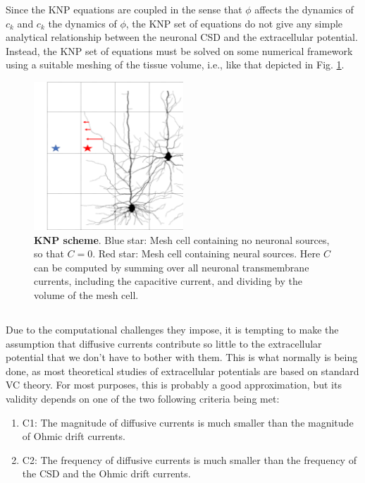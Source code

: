 Since the KNP equations are coupled in the sense that $\phi$ affects the dynamics of $c_k$ and $c_k$ the dynamics of $\phi$, the KNP set of equations do not give any simple analytical relationship between the neuronal CSD and the extracellular potential. Instead, the KNP set of equations must be solved on some numerical framework using a suitable meshing of the tissue volume, i.e., like that depicted in Fig. \ref{Eldiff:fig:KNPmesh}.

\begin{figure}[!ht]
\begin{center}
\includegraphics[width=0.5\textwidth]{Figures/Eldiff/KNP.png}
\end{center}
\caption{\textbf{KNP scheme}. Blue star: Mesh cell containing no neuronal sources, so that $C=0$. Red star: Mesh cell containing neural sources. Here $C$ can be computed by summing over all neuronal transmembrane currents, including the capacitive current, and dividing by the volume of the mesh cell. }
\label{Eldiff:fig:KNPmesh}
\end{figure}


\subsection{}
Due to the computational challenges they impose, it is tempting to make the assumption that diffusive currents contribute so little to the extracellular potential that we don't have to bother with them. This is what normally is being done, as most theoretical studies of extracellular potentials are based on standard VC theory. For most purposes, this is probably a good approximation, but its validity depends on one of the two following criteria being met:

\begin{enumerate}
\item C1: The magnitude of diffusive currents is much smaller than the magnitude of Ohmic drift currents.
\item C2: The frequency of diffusive currents is much smaller than the frequency of the CSD and the Ohmic drift currents. 
\end{enumerate}

